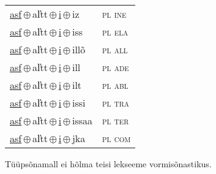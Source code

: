 \begin{minipage}{\textwidth}
\begin{sideways}
\begin{tabular}{l l}
\underline{asf}\,$\oplus$\,al̕tt\,$\oplus$\,\underline{i}\,$\oplus$\,iz & \textsc{ pl ine } \\
\underline{asf}\,$\oplus$\,al̕tt\,$\oplus$\,\underline{i}\,$\oplus$\,iss & \textsc{ pl ela } \\
\underline{asf}\,$\oplus$\,al̕tt\,$\oplus$\,\underline{i}\,$\oplus$\,illõ & \textsc{ pl all } \\
\underline{asf}\,$\oplus$\,al̕tt\,$\oplus$\,\underline{i}\,$\oplus$\,ill & \textsc{ pl ade } \\
\underline{asf}\,$\oplus$\,al̕tt\,$\oplus$\,\underline{i}\,$\oplus$\,ilt & \textsc{ pl abl } \\
\underline{asf}\,$\oplus$\,al̕tt\,$\oplus$\,\underline{i}\,$\oplus$\,issi & \textsc{ pl tra } \\
\underline{asf}\,$\oplus$\,al̕tt\,$\oplus$\,\underline{i}\,$\oplus$\,issaa & \textsc{ pl ter } \\
\underline{asf}\,$\oplus$\,al̕tt\,$\oplus$\,\underline{i}\,$\oplus$\,jka & \textsc{ pl com } \\
\end{tabular}
\end{sideways}
\label{tab:tüüpsõnamall-asfi}

\end{minipage}

 
\vspace{1em}
\noindent Tüüpsõnamall  ei hõlma teisi lekseeme vormi\-sõnastikus.
